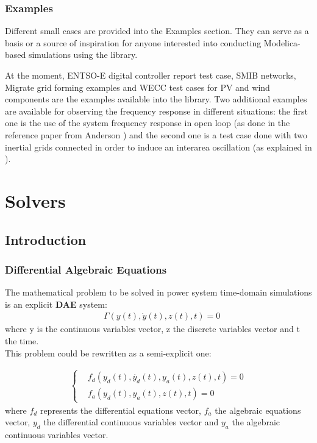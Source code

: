 \documentclass[a4paper, 12pt]{report}
\begin{document}
\subsubsection{Examples}

Different small cases are provided into the Examples section. They can serve as a basis or a source of inspiration for anyone interested into conducting Modelica-based simulations using the \Dynawo library.

At the moment, ENTSO-E digital controller report test case, SMIB networks, Migrate grid forming examples and \ac{WECC} test cases for PV and wind components are the examples available into the library.
Two additional examples are available for observing the frequency response in different situations: the first one is the use of the system frequency response in open loop (as done in the reference paper from Anderson \cite{Anderson}) and the second one is a test case done with two inertial grids connected in order to induce an interarea oscillation (as explained in \cite{Cardozo_InertialGrid}).

\section{Solvers}

\subsection{Introduction}
\label{sec:Solver Introduction}

\subsubsection{Differential Algebraic Equations}

The mathematical problem to be solved in power system time-domain simulations is an explicit \textbf{\ac{DAE}} system:\\
\begin{equation}
\begin{aligned}
& \Gamma(y(t), \dot{y}(t), z(t), t) = 0
\end{aligned}
\label{DAE}
\end{equation}
where y is the continuous variables vector, z the discrete variables vector and t the time. \\

This problem could be rewritten as a semi-explicit one:

\begin{equation}
\begin{aligned}
\begin{cases}
& f_d(y_d(t), \dot{y_d}(t), y_a(t), z(t), t) = 0 \\
& f_a(y_d(t), y_a(t), z(t), t) = 0
\end{cases}
\end{aligned}
\end{equation}
where $f_d$ represents the differential equations vector, $f_a$ the algebraic equations vector, $y_d$ the differential continuous variables vector and $y_a$ the algebraic continuous variables vector. \\
\end{document}
